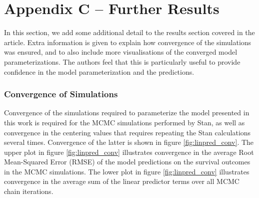 \documentclass[
]{article}
\begin{document}
\newpage

\hypertarget{appendix-c-further-results}{%
\section{Appendix C -- Further Results}\label{appendix-c-further-results}}

In this section, we add some additional detail to the results section covered in the article. Extra information is given to explain how convergence of the simulations was ensured, and to also include more visualisations of the converged model parameterizations. The authors feel that this is particularly useful to provide confidence in the model parameterization and the predictions.

\hypertarget{convergence-of-simulations}{%
\subsubsection{Convergence of Simulations}\label{convergence-of-simulations}}

Convergence of the simulations required to parameterize the model presented in this work is required for the MCMC simulations performed by Stan, as well as convergence in the centering values that requires repeating the Stan calculations several times. Convergence of the latter is shown in figure \ref{fig:linpred_conv}. The upper plot in figure \ref{fig:linpred_conv} illustrates convergence in the average Root Mean-Squared Error (RMSE) of the model predictions on the survival outcomes in the MCMC simulations. The lower plot in figure \ref{fig:linpred_conv} illustrates convergence in the average sum of the linear predictor terms over all MCMC chain iterations.
\end{document}
